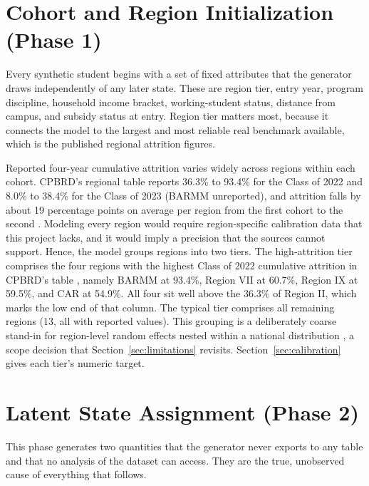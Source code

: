 \documentclass[11pt]{article}
\begin{document}
\section{Cohort and Region Initialization (Phase 1)}
\label{sec:phase1}

\hspace*{\parindent}Every synthetic student begins with a set of fixed attributes that the generator draws independently of any later state. These are region tier, entry year, program discipline, household income bracket, working-student status, distance from campus, and subsidy status at entry. Region tier matters most, because it connects the model to the largest and most reliable real benchmark available, which is the published regional attrition figures.

Reported four-year cumulative attrition varies widely across regions within each cohort. CPBRD's regional table reports 36.3\% to 93.4\% for the Class of 2022 and 8.0\% to 38.4\% for the Class of 2023 (BARMM unreported), and attrition falls by about 19 percentage points on average per region from the first cohort to the second \citep{cpbrd2026}. Modeling every region would require region-specific calibration data that this project lacks, and it would imply a precision that the sources cannot support. Hence, the model groups regions into two tiers. The high-attrition tier comprises the four regions with the highest Class of 2022 cumulative attrition in CPBRD's table \citep{cpbrd2026}, namely BARMM at 93.4\%, Region VII at 60.7\%, Region IX at 59.5\%, and CAR at 54.9\%. All four sit well above the 36.3\% of Region II, which marks the low end of that column. The typical tier comprises all remaining regions (13, all with reported values). This grouping is a deliberately coarse stand-in for region-level random effects nested within a national distribution \citep{gelman2013bda}, a scope decision that Section~\ref{sec:limitations} revisits. Section~\ref{sec:calibration} gives each tier's numeric target.

\FloatBarrier
\section{Latent State Assignment (Phase 2)}
\label{sec:phase2}

\hspace*{\parindent}This phase generates two quantities that the generator never exports to any table and that no analysis of the dataset can access. They are the true, unobserved cause of everything that follows.
\end{document}
